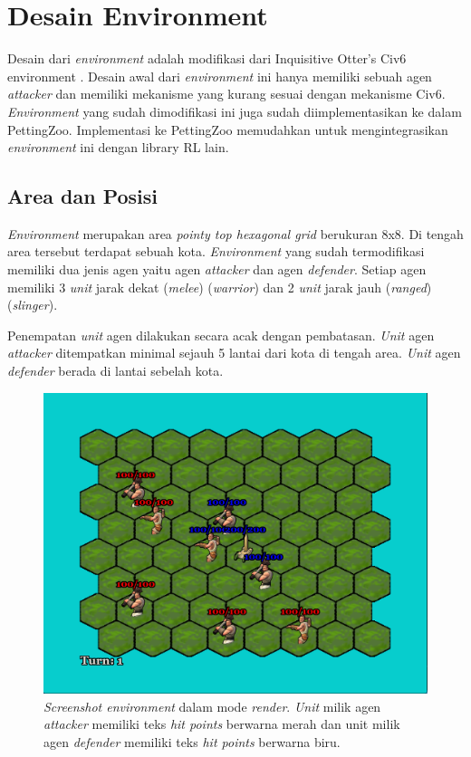 \section{Desain Environment}
Desain dari \emph{environment} adalah modifikasi dari Inquisitive Otter's Civ6 environment \citep{civ6Environment}. 
Desain awal dari \emph{environment} ini hanya memiliki sebuah agen \emph{attacker} dan memiliki mekanisme yang kurang sesuai dengan mekanisme Civ6.
\emph{Environment} yang sudah dimodifikasi ini juga sudah diimplementasikan ke dalam PettingZoo.
Implementasi ke PettingZoo memudahkan untuk mengintegrasikan \emph{environment} ini dengan library RL lain.

\subsection{Area dan Posisi}
\emph{Environment} merupakan area \emph{pointy top hexagonal grid} berukuran 8x8. Di tengah area tersebut terdapat sebuah kota.
\emph{Environment} yang sudah termodifikasi memiliki dua jenis agen yaitu agen \emph{attacker} dan agen \emph{defender}.
Setiap agen memiliki 3 \emph{unit} jarak dekat (\emph{melee}) (\emph{warrior}) dan 2 \emph{unit} jarak jauh (\emph{ranged}) (\emph{slinger}).

Penempatan \emph{unit} agen dilakukan secara acak dengan pembatasan.
\emph{Unit} agen \emph{attacker} ditempatkan minimal sejauh 5 lantai dari kota di tengah area.
\emph{Unit} agen \emph{defender} berada di lantai sebelah kota.


\begin{figure}[H]
  \centering
    \includegraphics[scale=0.4]{gambar/environment_screenshot.png}
    \caption{\emph{Screenshot environment} dalam mode \emph{render}. \emph{Unit} milik agen \emph{attacker} memiliki teks \emph{hit points} berwarna merah dan unit milik agen \emph{defender} memiliki teks \emph{hit points} berwarna biru.}
    \label{fig:environmentScreenshot}
\end{figure}


